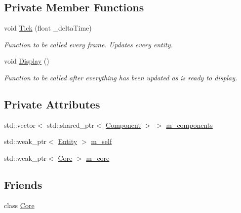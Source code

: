 \subsection*{Private Member Functions}
\begin{DoxyCompactItemize}
\item 
void \mbox{\hyperlink{class_disc___engine_1_1_entity_a5c21de8049a0b5aa7dce577f322338d7}{Tick}} (float \+\_\+delta\+Time)
\begin{DoxyCompactList}\small\item\em Function to be called every frame. Updates every entity. \end{DoxyCompactList}\item 
void \mbox{\hyperlink{class_disc___engine_1_1_entity_a72ab24c9e9ed682c7052e83cac5ca4dd}{Display}} ()
\begin{DoxyCompactList}\small\item\em Function to be called after everything has been updated as is ready to display. \end{DoxyCompactList}\end{DoxyCompactItemize}
\subsection*{Private Attributes}
\begin{DoxyCompactItemize}
\item 
std\+::vector$<$ std\+::shared\+\_\+ptr$<$ \mbox{\hyperlink{class_disc___engine_1_1_component}{Component}} $>$ $>$ \mbox{\hyperlink{class_disc___engine_1_1_entity_a16f73c84e8928aab5fade057de148a27}{m\+\_\+components}}
\item 
std\+::weak\+\_\+ptr$<$ \mbox{\hyperlink{class_disc___engine_1_1_entity}{Entity}} $>$ \mbox{\hyperlink{class_disc___engine_1_1_entity_a23c18419f498492049914ce84bac9c1e}{m\+\_\+self}}
\item 
std\+::weak\+\_\+ptr$<$ \mbox{\hyperlink{class_disc___engine_1_1_core}{Core}} $>$ \mbox{\hyperlink{class_disc___engine_1_1_entity_a5b1eae1a1711ee920d756812c6eb4ba6}{m\+\_\+core}}
\end{DoxyCompactItemize}
\subsection*{Friends}
\begin{DoxyCompactItemize}
\item 
class \mbox{\hyperlink{class_disc___engine_1_1_entity_a4107254ac74f90d4f91e810d755b98c2}{Core}}
\end{DoxyCompactItemize}


